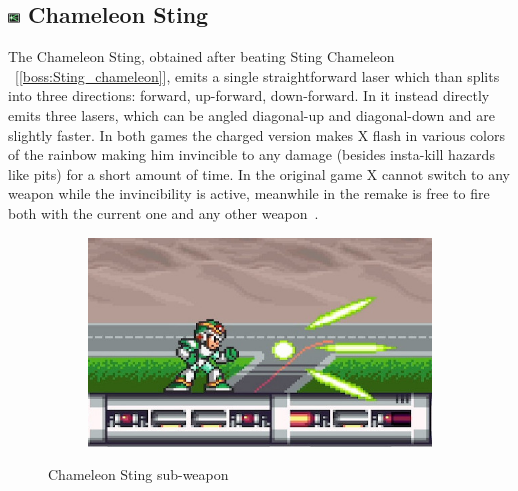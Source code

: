 \subsection{\includegraphics[width=12px, height=10px]{figures/X1/weapons/C_sting.jpg} Chameleon Sting}\label{Chameleon_sting}
The Chameleon Sting, obtained after beating Sting Chameleon ~[\ref{boss:Sting_chameleon}], emits a single straightforward laser which than splits into three directions: forward, up-forward, down-forward. In \mhx it instead directly emits three lasers, which can be angled diagonal-up and diagonal-down and are slightly faster. In both games the charged version makes X flash in various colors of the rainbow making him invincible to any damage (besides insta-kill hazards like pits) for a short amount of time. In the original game X cannot switch to any weapon while the invincibility is active, meanwhile in the remake is free to fire both with the current one and any other weapon~\cite{wiki:Chameleon_sting}.
\begin{figure}[htp]
	\centering
	\begin{subfigure}{0.35\linewidth}
		\includegraphics[width=\linewidth]{figures/X1/weapons/Chameleon_sting.jpg}
	\end{subfigure}
	\caption{Chameleon Sting sub-weapon}
\end{figure}

